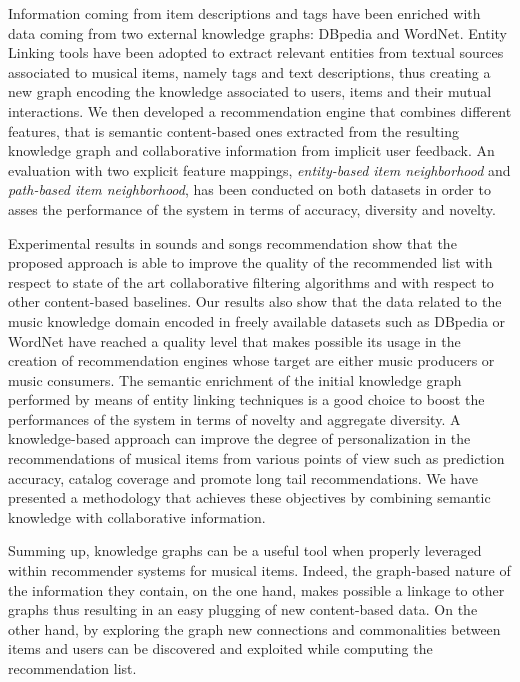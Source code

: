 Information coming from item descriptions and tags have been %
enriched with data coming from two external knowledge graphs: DBpedia and WordNet. Entity Linking tools have been adopted to extract relevant entities from textual sources associated to musical items, namely tags and text descriptions, thus creating a new graph encoding the knowledge associated to users, items and their mutual interactions. We then developed a recommendation engine that combines different features, that is semantic content-based ones extracted from the resulting knowledge graph and collaborative information from implicit user feedback. An evaluation with two explicit feature mappings, \textit{entity-based item neighborhood} and \textit{path-based item neighborhood}, has been conducted on both datasets in order to asses the performance of the system in terms of accuracy, diversity and novelty. 

Experimental results in sounds and songs recommendation show that the proposed approach is able to improve the quality of the recommended list with respect to state of the art collaborative filtering algorithms and with respect to other content-based baselines. Our results also show that the data related to the music knowledge domain encoded in freely available datasets such as DBpedia or WordNet have reached a quality level that makes possible its usage in the creation of recommendation engines whose target are either music producers or music consumers. The semantic enrichment of the initial knowledge graph performed by means of entity linking techniques is a good choice to boost the performances of the system in terms of novelty and aggregate diversity. A knowledge-based approach can improve the degree of personalization in the recommendations of musical items from various points of view such as prediction accuracy, catalog coverage and promote long tail recommendations. We have presented a methodology that achieves these objectives by combining semantic knowledge with collaborative information. 

Summing up, knowledge graphs can be a useful tool when properly leveraged within recommender systems for musical items. Indeed, the graph-based nature of the information they contain, on the one hand, makes possible a linkage to other graphs thus resulting in an easy plugging of new content-based data. On the other hand, by exploring the graph new connections and commonalities between items and users can be discovered and exploited while computing the recommendation list.


